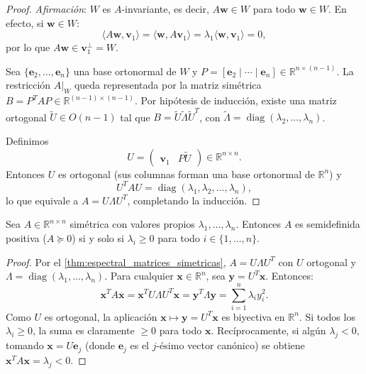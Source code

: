 \begin{proof}
	\textit{Afirmación}: $W$ es $A$-invariante, es decir, $A\mathbf{w} \in W$ para todo $\mathbf{w} \in W$. En efecto, si $\mathbf{w} \in W$:
	\[
		\langle A\mathbf{w}, \mathbf{v}_1 \rangle = \langle \mathbf{w}, A\mathbf{v}_1 \rangle = \lambda_1 \langle \mathbf{w}, \mathbf{v}_1 \rangle = 0,
	\]
	por lo que $A\mathbf{w} \in \mathbf{v}_1^\perp = W$.

	Sea $\{\mathbf{e}_2, \ldots, \mathbf{e}_n\}$ una base ortonormal de $W$ y $P = [\mathbf{e}_2 \mid \cdots \mid \mathbf{e}_n] \in \mathbb{R}^{n \times (n-1)}$. La restricción $A|_W$ queda representada por la matriz simétrica $B = P^T A P \in \mathbb{R}^{(n-1) \times (n-1)}$. Por hipótesis de inducción, existe una matriz ortogonal $\tilde{U} \in O(n-1)$ tal que $B = \tilde{U} \tilde{\Lambda} \tilde{U}^T$, con $\tilde{\Lambda} = \operatorname{diag}(\lambda_2, \ldots, \lambda_n)$.

	Definimos
	\[
		U = \begin{pmatrix} \mathbf{v}_1 & P\tilde{U} \end{pmatrix} \in \mathbb{R}^{n \times n}.
	\]
	Entonces $U$ es ortogonal (sus columnas forman una base ortonormal de $\mathbb{R}^n$) y
	\[
		U^T A U = \operatorname{diag}(\lambda_1, \lambda_2, \ldots, \lambda_n),
	\]
	lo que equivale a $A = U \Lambda U^T$, completando la inducción.
\end{proof}

\begin{corollary}\label{cor:caracterizacion_semidefinida}
	Sea $A \in \mathbb{R}^{n \times n}$ simétrica con valores propios $\lambda_1, \ldots, \lambda_n$. Entonces $A$ es semidefinida positiva ($A \succeq 0$) si y solo si $\lambda_i \geq 0$ para todo $i \in \{1, \ldots, n\}$.
\end{corollary}

\begin{proof}
	Por el \autoref{thm:espectral_matrices_simetricas}, $A = U \Lambda U^T$ con $U$ ortogonal y $\Lambda = \operatorname{diag}(\lambda_1, \ldots, \lambda_n)$. Para cualquier $\mathbf{x} \in \mathbb{R}^n$, sea $\mathbf{y} = U^T \mathbf{x}$. Entonces:
	\[
		\mathbf{x}^T A \mathbf{x} = \mathbf{x}^T U \Lambda U^T \mathbf{x} = \mathbf{y}^T \Lambda \mathbf{y} = \sum_{i=1}^n \lambda_i y_i^2.
	\]
	Como $U$ es ortogonal, la aplicación $\mathbf{x} \mapsto \mathbf{y} = U^T \mathbf{x}$ es biyectiva en $\mathbb{R}^n$. Si todos los $\lambda_i \geq 0$, la suma es claramente $\geq 0$ para todo $\mathbf{x}$. Recíprocamente, si algún $\lambda_j < 0$, tomando $\mathbf{x} = U\mathbf{e}_j$ (donde $\mathbf{e}_j$ es el $j$-ésimo vector canónico) se obtiene $\mathbf{x}^T A \mathbf{x} = \lambda_j < 0$.
\end{proof}

